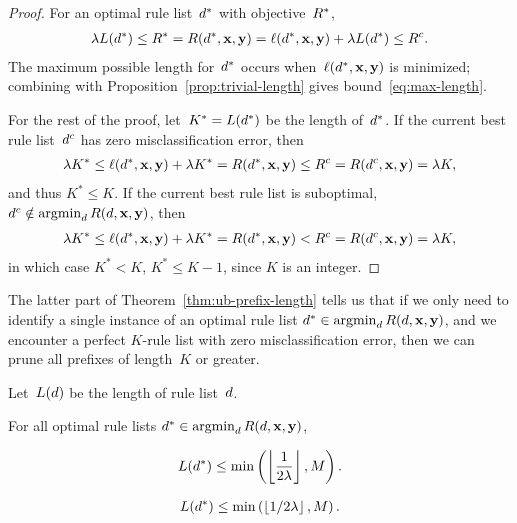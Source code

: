 \begin{arxiv}
\begin{proof}
For an optimal rule list~$d^*$ with objective~$R^*$,
\begin{align}
{\lambda} L(d^*) \le R^* = R(d^*, \mathbf{x}, \mathbf{y})
= \ell(d^*, \mathbf{x}, \mathbf{y}) + {\lambda} L(d^*)
\le {R^c}.
\end{align}
The maximum possible length for~$d^*$ occurs
when~$\ell(d^*, \mathbf{x}, \mathbf{y})$ is minimized;
combining with Proposition~\ref{prop:trivial-length}
gives bound~\eqref{eq:max-length}.

For the rest of the proof,
let~${K^* = L(d^*)}$ be the length of~$d^*$.
%
If the current best rule list~$d^c$ has zero
misclassification error, then
\begin{align}
{\lambda} K^* \leq \ell(d^*, \mathbf{x}, \mathbf{y}) + {\lambda} K^* = R(d^*, \mathbf{x}, \mathbf{y})
\le {R^c} = R(d^c, \mathbf{x}, \mathbf{y}) = {\lambda} K,
\end{align}
and thus ${K^* \leq K}$.
%
If the current best rule list is suboptimal,
\ie ${d^c \notin \operatorname*{argmin}_{d} R({d}, \mathbf{x}, \mathbf{y})}$, then
%
\begin{align}
{\lambda} K^* \leq \ell(d^*, \mathbf{x}, \mathbf{y}) + {\lambda} K^* = R(d^*, \mathbf{x}, \mathbf{y})
< {R^c} = R(d^c, \mathbf{x}, \mathbf{y}) = {\lambda} K,
\end{align}
in which case ${K^* < K}$, \ie ${K^* \leq K-1}$, since $K$ is an integer.
\end{proof}

The latter part of Theorem~\ref{thm:ub-prefix-length} tells us that
if we only need to identify a single instance of an optimal rule list
${d^* \in \operatorname*{argmin}_{d} R({d}, \mathbf{x}, \mathbf{y})}$, and we encounter a perfect
$K$-rule list with zero misclassification error, then we can prune all
prefixes of length~$K$ or greater.

\end{arxiv}

\begin{corollary}
\label{cor:ub-prefix-length}
\begin{arxiv}
Let~$L({d})$ be the length of rule list~${d}$.
\end{arxiv}
%
For all optimal rule lists ${d^* \in \operatorname*{argmin}_{d} R({d}, \mathbf{x}, \mathbf{y})}$,
\begin{arxiv}
\begin{align}
L(d^*) \le \min \left( \left\lfloor \frac{1}{2{\lambda}} \right\rfloor, M \right).
\label{eq:max-length-trivial}
\end{align}
\end{arxiv}
\begin{kdd}
\begin{align}
L(d^*) \le \min \left( \left\lfloor 1 / 2{\lambda} \right\rfloor, M \right).
\label{eq:max-length-trivial}
\end{align}
\end{kdd}
\end{corollary}


